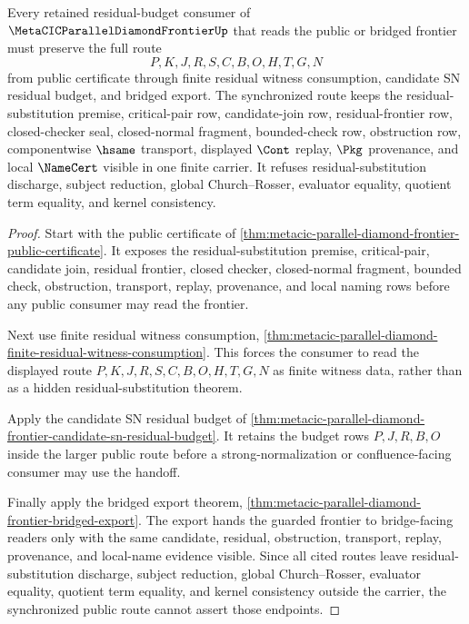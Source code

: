 \begin{theorem}
\label{thm:metacic-parallel-diamond-frontier-public-route-sync}
Every retained residual-budget consumer of $\MetaCICParallelDiamondFrontierUp$ that reads the public or bridged frontier must preserve the full route
$$
P,K,J,R,S,C,B,O,H,T,G,N
$$
from public certificate through finite residual witness consumption, candidate SN residual budget, and bridged export. The synchronized route keeps the residual-substitution premise, critical-pair row, candidate-join row, residual-frontier row, closed-checker seal, closed-normal fragment, bounded-check row, obstruction row, componentwise $\hsame$ transport, displayed $\Cont$ replay, $\Pkg$ provenance, and local $\NameCert$ visible in one finite carrier. It refuses residual-substitution discharge, subject reduction, global Church--Rosser, evaluator equality, quotient term equality, and kernel consistency.
\end{theorem}
\begin{proof}
Start with the public certificate of \autoref{thm:metacic-parallel-diamond-frontier-public-certificate}. It exposes the residual-substitution premise, critical-pair, candidate join, residual frontier, closed checker, closed-normal fragment, bounded check, obstruction, transport, replay, provenance, and local naming rows before any public consumer may read the frontier.

Next use finite residual witness consumption, \autoref{thm:metacic-parallel-diamond-finite-residual-witness-consumption}. This forces the consumer to read the displayed route $P,K,J,R,S,C,B,O,H,T,G,N$ as finite witness data, rather than as a hidden residual-substitution theorem.

Apply the candidate SN residual budget of \autoref{thm:metacic-parallel-diamond-frontier-candidate-sn-residual-budget}. It retains the budget rows $P,J,R,B,O$ inside the larger public route before a strong-normalization or confluence-facing consumer may use the handoff.

Finally apply the bridged export theorem, \autoref{thm:metacic-parallel-diamond-frontier-bridged-export}. The export hands the guarded frontier to bridge-facing readers only with the same candidate, residual, obstruction, transport, replay, provenance, and local-name evidence visible. Since all cited routes leave residual-substitution discharge, subject reduction, global Church--Rosser, evaluator equality, quotient term equality, and kernel consistency outside the carrier, the synchronized public route cannot assert those endpoints.
\end{proof}

